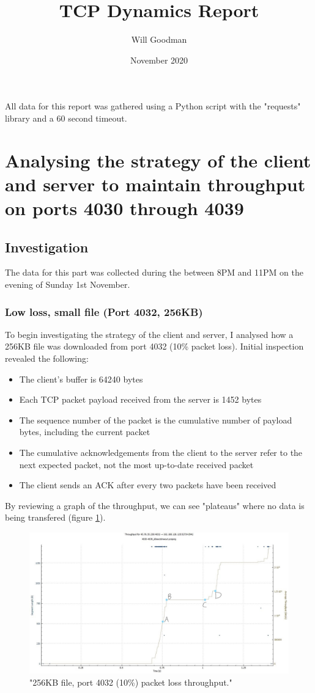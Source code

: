 \documentclass[12pt]{article}
\title{TCP Dynamics Report}
\date{November 2020}
\author{Will Goodman}
\begin{document}
\maketitle

All data for this report was gathered using a Python script with the "requests" library and a 60 second timeout.

\section{Analysing the strategy of the client and server to maintain throughput on ports 4030 through 4039}
\subsection*{Investigation}
The data for this part was collected during the between 8PM and 11PM on the evening of Sunday 1st November.

\subsubsection*{Low loss, small file (Port 4032, 256KB)}
To begin investigating the strategy of the client and server, I analysed how a 256KB file was downloaded from port 4032 (10\% packet loss).
Initial inspection revealed the following:
\begin{itemize}
  \item The client's buffer is 64240 bytes
  \item Each TCP packet payload received from the server is 1452 bytes
  \item The sequence number of the packet is the cumulative number of payload bytes, including the current packet
  \item The cumulative acknowledgements from the client to the server refer to the next expected packet, not the most up-to-date received packet
  \item The client sends an ACK after every two packets have been received
\end{itemize}

By reviewing a graph of the throughput, we can see "plateaus" where no data is being transfered (figure \ref{figure1: 4032:256KB Throughput}).

\begin{figure}[!htbp]
  \centering
  \includegraphics[scale=0.3]{4032_256KB_throughput-marked-points.jpg}
  \caption{"256KB file, port 4032 (10\%) packet loss throughput."}
  \label{figure1: 4032:256KB Throughput}
\end{figure}
\end{document}
